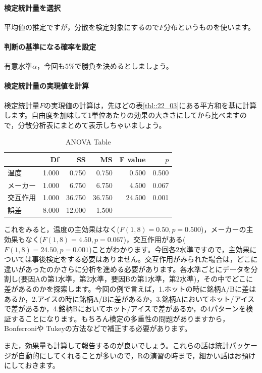 \documentclass{ltjsarticle}
\begin{document}
\paragraph{検定統計量を選択}平均値の推定ですが，分散を検定対象にするので$F$分布というものを使います。
\paragraph{判断の基準になる確率を設定}有意水準$\alpha$，今回も5\%で勝負を決めるとしましょう。
\paragraph{検定統計量の実現値を計算}検定統計量$F$の実現値の計算は，先ほどの表\ref{tbl::22_03}にある平方和を基に計算します。自由度を加味して1単位あたりの効果の大きさにしてから比べますので，分散分析表にまとめて表示しちゃいましょう。
\begin{table}[ht]
  \centering
  \caption{ANOVA Table} 
  \begin{tabular}{lrrrrr}
    \hline
   & Df & SS & MS & F value & $p$ \\ 
    \hline
  温度          & 1.000 & 0.750 & 0.750 & 0.500 & 0.500 \\ 
    メーカー      & 1.000 & 6.750 & 6.750 & 4.500 & 0.067 \\ 
交互作用 & 1.000 & 36.750 & 36.750 & 24.500 & 0.001 \\ 
    誤差     & 8.000 & 12.000 & 1.500 &  &  \\ 
     \hline
  \end{tabular}
    \label{tbl::22_04}
  \end{table}
これをみると，温度の主効果はなく($F(1,8)=0.50,p=0.500$)，メーカーの主効果もなく($F(1,8)=4.50,p=0.067$)，交互作用がある($F(1,8)=24.50,p=0.001$)ことがわかります。今回各2水準ですので，主効果については事後検定をする必要はありません。交互作用がみられた場合は，どこに違いがあったのかさらに分析を進める必要があります。各水準ごとにデータを分割し(要因Aの第1水準，第2水準，要因Bの第1水準，第2水準)，その中でどこに差があるのかを探索します。今回の例で言えば，1.ホットの時に銘柄A/Bに差はあるか，2.アイスの時に銘柄A/Bに差があるか，3.銘柄Aにおいてホット/アイスで差があるか，4.銘柄Bにおいてホット/アイスで差があるか，の4パターンを検証することになります。もちろん検定の多重性の問題がありますから，Bonferroniや Tukeyの方法などで補正する必要があります。

また，効果量も計算して報告するのが良いでしょう。これらの話は統計パッケージが自動的にしてくれることが多いので，Rの演習の時まで，細かい話はお預けにしておきます。
\end{document}
